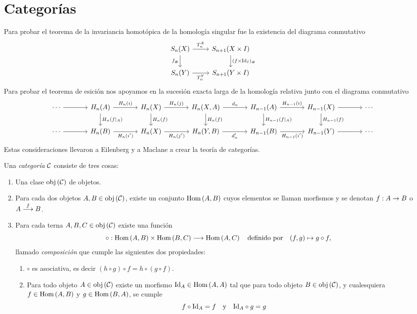 \documentclass[../../topologia_algebraica]{subfiles}
\begin{document}
\chapter*{Categor\'ias}

Para probar el teorema de la invariancia homot\'opica de la homolog\'ia singular fue la
existencia del diagrama conmutativo
\[
  \begin{tikzcd}
    S_n(X) \arrow[r,"T^X_n"] \arrow[d,"f_{\#}"'] & S_{n+1}(X\times I) \arrow[d,"(f\times\Id_I)_{\#}"]\\
    S_n(Y) \arrow[r,"T^Y_n"'] & S_{n+1}(Y\times I)
  \end{tikzcd}
\]
Para probar el teorema de esici\'on nos apoyamos en la sucesi\'on exacta larga de la
homolog\'ia relativa junto con el diagrama conmutativo
\[
  \begin{tikzcd}[column sep=large]
    \cdots \arrow[r] & H_n(A) \arrow[r,"H_n(\imath)"] \arrow[d,"H_n(f|_A)"]&
    H_n(X) \arrow[r,"H_n(j)"] \arrow[d,"H_n(f)"] & H_n(X,A) \arrow[r,"d_n"] \arrow[d,"H_n(f)"] &
    H_{n-1}(A) \arrow[r,"H_{n-1}(\imath)"] \arrow[d,"H_{n-1}(f|_A)"] &
    H_{n-1}(X) \arrow[r] \arrow[d,"H_{n-1}(f)"] & \cdots\\
     \cdots \arrow[r] & H_n(B) \arrow[r,"H_n(\imath')"'] & H_n(X) \arrow[r,"H_n(j')"'] &
    H_n(Y,B) \arrow[r,"d'_n"'] & H_{n-1}(B) \arrow[r,"H_{n-1}(\imath')"'] & H_{n-1}(Y) \arrow[r] & \cdots
   \end{tikzcd}
 \]
 Estas consideraciones llevaron a Eilenberg y a Maclane a crear la teor\'ia de categor\'ias.

 \begin{defin}
   Una \emph{categor\'ia} $\mathcal{C}$ consiste de tres cosas:
   \begin{enumerate}
   \item Una clase $\text{obj}\left( \mathcal{C} \right)$ de objetos.
   \item Para cada dos objetos $A,B\in\text{obj}\left( \mathcal{C} \right)$, existe un conjunto $\text{Hom}\left( A,B \right)$ cuyos
     elementos se llaman morfismos y se denotan $f:A\rightarrow B$ o $A\overset{f}{\longrightarrow}B$.
   \item Para cada terna $A,B,C\in\text{obj}\left( \mathcal{C} \right)$ existe una funci\'on
     \[
       \circ:\text{Hom}\left( A,B \right)\times\text{Hom}\left( B,C \right)\longrightarrow \text{Hom}\left( A,C \right) \quad\text{definido por}\quad
       (f,g)\mapsto g\circ f,
     \]
     llamado \emph{composici\'on} que cumple las siguientes dos propiedades:
     \begin{enumerate}
     \item $\circ$ es asociativa, es decir $(h\circ g)\circ f=h\circ(g\circ f)$.
     \item Para todo objeto $A\in\text{obj}\left( \mathcal{C} \right)$ existe un morfismo $\text{Id}_A\in\text{Hom}\left( A,A \right)$
       tal que para todo objeto $B\in\text{obj}\left( \mathcal{C} \right)$, y cualesquiera $f\in\text{Hom}\left( A,B \right)$ y
       $g\in\text{Hom}\left( B,A \right)$, se cumple
       \[
         f\circ\text{Id}_A=f\quad\text{y}\quad \text{Id}_A\circ g=g
       \]
     \end{enumerate}
   \end{enumerate}
 \end{defin}
\end{document}
